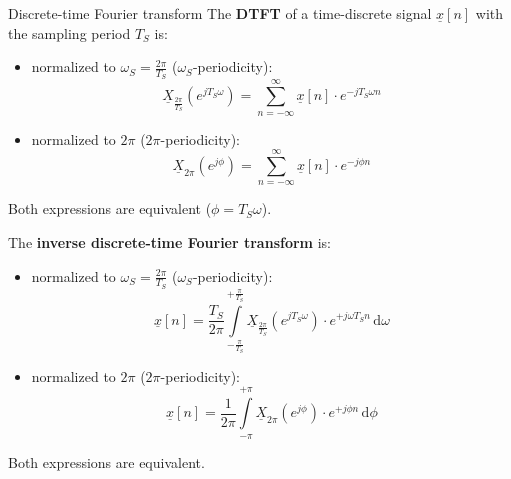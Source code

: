 \begin{refsection}
\begin{definition}{Discrete-time Fourier transform}
	The  \textbf{\acf{DTFT}} of a time-discrete signal $\underline{x}[n]$ with the sampling period $T_S$ is:
	\begin{itemize}
		\item normalized to $\omega_S = \frac{2\pi}{T_S}$ ($\omega_S$-periodicity):
		\begin{equation}
			\underline{X}_{\frac{2\pi}{T_S}} \left(e^{j T_S \omega}\right) = \sum\limits_{n = -\infty}^{\infty} \underline{x}[n] \cdot e^{-j T_S \omega n}
		\end{equation}
		\item normalized to $2 \pi$ ($2 \pi$-periodicity):
		\begin{equation}
			\underline{X}_{2 \pi} \left(e^{j \phi}\right) = \sum\limits_{n = -\infty}^{\infty} \underline{x}[n] \cdot e^{-j \phi n}
		\end{equation}
	\end{itemize}
	Both expressions are equivalent ($\phi = T_S \omega$).
	
	The  \textbf{inverse discrete-time Fourier transform} is:
	\begin{itemize}
		\item normalized to $\omega_S = \frac{2\pi}{T_S}$ ($\omega_S$-periodicity):
		\begin{equation}
			\underline{x}[n] = \frac{T_S}{2 \pi} \int\limits_{- \frac{\pi}{T_S}}^{+ \frac{\pi}{T_S}} \underline{X}_{\frac{2\pi}{T_S}}(e^{j T_S \omega}) \cdot e^{+ j \omega T_S n} \, \mathrm{d} \omega
		\end{equation}
		\item normalized to $2 \pi$ ($2 \pi$-periodicity):
		\begin{equation}
			\underline{x}[n] = \frac{1}{2 \pi} \int\limits_{- \pi}^{+ \pi} \underline{X}_{2\pi}(e^{j \phi}) \cdot e^{+ j \phi n} \, \mathrm{d} \phi
		\end{equation}
	\end{itemize}
	Both expressions are equivalent.
\end{definition}


\end{refsection}
